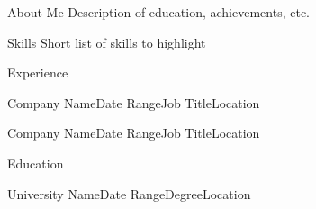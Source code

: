 \documentclass{resume}
\begin{document}
\begin{rSection}{About Me}
  Description of education, achievements, etc.
\end{rSection}

\begin{rSection}{Skills}
  Short list of skills to highlight
\end{rSection}

\begin{rSection}{Experience}

  \begin{rSubsection}{Company Name}{Date Range}{Job Title}{Location}
  \end{rSubsection}

  \begin{rSubsection}{Company Name}{Date Range}{Job Title}{Location}
  \end{rSubsection}

\end{rSection}

\begin{rSection}{Education}
  \begin{rSubsection}{University Name}{Date Range}{Degree}{Location}
  \end{rSubsection}
\end{rSection}
\end{document}
